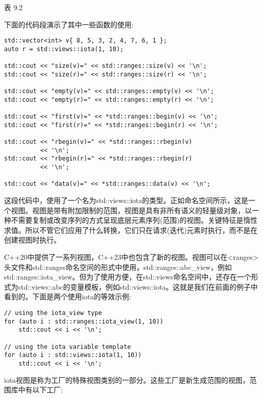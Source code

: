 \begin{center}
表 9.2
\end{center}

下面的代码段演示了其中一些函数的使用:

\begin{lstlisting}[style=styleCXX]
std::vector<int> v{ 8, 5, 3, 2, 4, 7, 6, 1 };
auto r = std::views::iota(1, 10);

std::cout << "size(v)=" << std::ranges::size(v) << '\n';
std::cout << "size(r)=" << std::ranges::size(r) << '\n';

std::cout << "empty(v)=" << std::ranges::empty(v) << '\n';
std::cout << "empty(r)=" << std::ranges::empty(r) << '\n';

std::cout << "first(v)=" << *std::ranges::begin(v) << '\n';
std::cout << "first(r)=" << *std::ranges::begin(r) << '\n';

std::cout << "rbegin(v)=" << *std::ranges::rbegin(v)
		  << '\n';
std::cout << "rbegin(r)=" << *std::ranges::rbegin(r)
		  << '\n';
		  
std::cout << "data(v)=" << *std::ranges::data(v) << '\n';
\end{lstlisting}

这段代码中，使用了一个名为std::views::iota的类型。正如命名空间所示，这是一个视图。视图是带有附加限制的范围，视图是具有非所有语义的轻量级对象，以一种不需要复制或改变序列的方式呈现底层元素序列(范围)的视图。关键特征是惰性求值。所以不管它们应用了什么转换，它们只在请求(迭代)元素时执行，而不是在创建视图时执行。

C++20中提供了一系列视图，C++23中也包含了新的视图。视图可以在<ranges>头文件和std::ranges命名空间的形式中使用，std::ranges::abc\_view，例如std::ranges::iota\_view。但为了使用方便，在std::views命名空间中，还存在一个形式为std::views::abc的变量模板，例如std::views::iota。这就是我们在前面的例子中看到的。下面是两个使用iota的等效示例:

\begin{lstlisting}[style=styleCXX]
// using the iota_view type
for (auto i : std::ranges::iota_view(1, 10))
	std::cout << i << '\n';

// using the iota variable template
for (auto i : std::views::iota(1, 10))
	std::cout << i << '\n';
\end{lstlisting}

iota视图是称为工厂的特殊视图类别的一部分。这些工厂是新生成范围的视图，范围库中有以下工厂:

